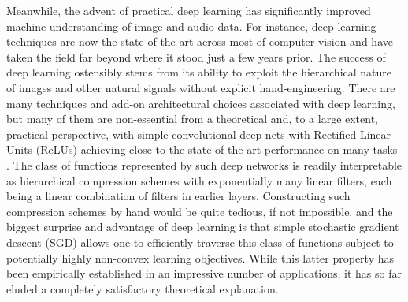 \documentclass[11pt]{article}
\begin{document}
Meanwhile, the advent of practical deep learning \cite{Goodfellow-et-al-2016} has significantly improved machine understanding of image and audio data. For instance, deep learning techniques are now the state of the art across most of computer vision and have taken the field far beyond where it stood just a few years prior.  
The success of deep learning ostensibly stems from its ability to exploit the hierarchical nature of images and other natural signals without explicit hand-engineering. There are many techniques and add-on architectural choices associated with deep learning, but many of them are non-essential from a theoretical and, to a large extent, practical perspective, with simple convolutional deep nets with Rectified Linear Units (ReLUs) achieving close to the state of the art performance on many tasks \cite{Simplicity}. The class of functions represented by such deep networks is readily interpretable as hierarchical compression schemes with exponentially many linear filters, each being a linear combination of filters in earlier layers. Constructing such compression schemes by hand would be quite tedious, if not impossible, and the biggest surprise and advantage of deep learning is that simple stochastic gradient descent (SGD) allows one to efficiently traverse this class of functions subject to potentially highly non-convex learning objectives. While this latter property has been empirically established in an impressive number of applications, it has so far eluded a completely satisfactory theoretical explanation.

\end{document}

